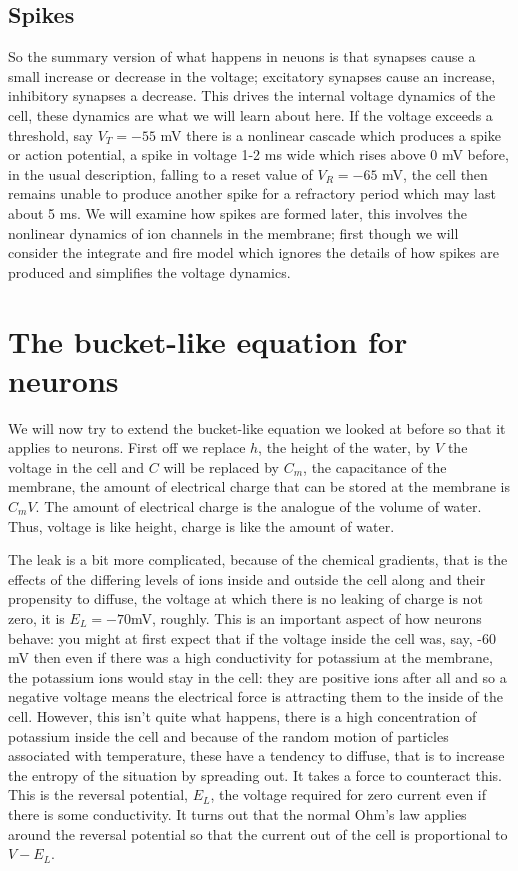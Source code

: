 \documentclass[11pt,a4paper]{scrartcl}
\begin{document}
\subsection*{Spikes}

So the summary version of what happens in neuons is that synapses
cause a small increase or decrease in the voltage; excitatory synapses
cause an increase, inhibitory synapses a decrease. This drives the
internal voltage dynamics of the cell, these dynamics are what we will
learn about here. If the voltage exceeds a threshold, say $V_T=-55$ mV
there is a nonlinear cascade which produces a spike or
action potential, a spike in voltage 1-2 ms wide which rises
above 0 mV before, in the usual description, falling to a reset value
of $V_R=-65$ mV, the cell then remains unable to produce another spike
for a refractory period which may last about 5 ms. We will
examine how spikes are formed later, this involves the nonlinear
dynamics of ion channels in the membrane; first though we will
consider the integrate and fire model which ignores the details of how
spikes are produced and simplifies the voltage dynamics.

\section*{The bucket-like equation for neurons}

We will now try to extend the bucket-like equation we looked at before
so that it applies to neurons. First off we replace $h$, the height of
the water, by $V$ the voltage in the cell and $C$ will be replaced by
$C_m$, the capacitance of the membrane, the amount of electrical
charge that can be stored at the membrane is $C_mV$. The amount of
electrical charge is the analogue of the volume of water. Thus,
voltage is like height, charge is like the amount of water.

The leak is a bit more complicated, because of the chemical gradients,
that is the effects of the differing levels of ions inside and outside
the cell along and their propensity to diffuse, the voltage at which
there is no leaking of charge is not zero, it is $E_L=-70 $mV,
roughly. This is an important aspect of how neurons behave: you might
at first expect that if the voltage inside the cell was, say, -60 mV
then even if there was a high conductivity for potassium at the
membrane, the potassium ions would stay in the cell: they are positive
ions after all and so a negative voltage means the electrical force is
attracting them to the inside of the cell. However, this isn't quite
what happens, there is a high concentration of potassium inside the
cell and because of the random motion of particles associated with
temperature, these have a tendency to diffuse, that is to increase the
entropy of the situation by spreading out. It takes a force to
counteract this. This is the reversal potential, $E_L$, the voltage
required for zero current even if there is some conductivity. It turns
out that the normal Ohm's law applies around the reversal potential so
that the current out of the cell is proportional to $V-E_L$.
\end{document}
